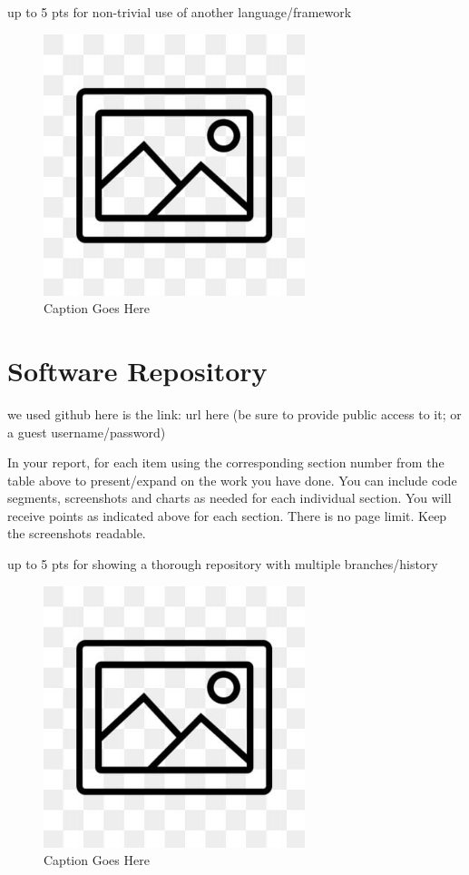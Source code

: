 \documentclass[12pt, letterpaper]{article}
\begin{document}
up to 5 pts for non-trivial use of another language/framework

\begin{figure}[htbp]
	\centering
	\includegraphics[width=3in]{images/placeholder.jpg}
	\caption{Caption Goes Here}
 \end{figure}

 \newpage

\section{Software Repository}
we used github here is the link: url here (be sure to provide public access to it; or a guest username/password)

In your report, for each item using the corresponding section number from the table above to present/expand on the work you have done. You can include code segments, screenshots and charts as needed for each individual section. You will receive points as indicated above for each section. There is no page limit. Keep the screenshots readable.

up to 5 pts for showing a thorough repository with multiple branches/history

\begin{figure}[htbp]
	\centering
	\includegraphics[width=3in]{images/placeholder.jpg}
	\caption{Caption Goes Here}
 \end{figure}
\end{document}
